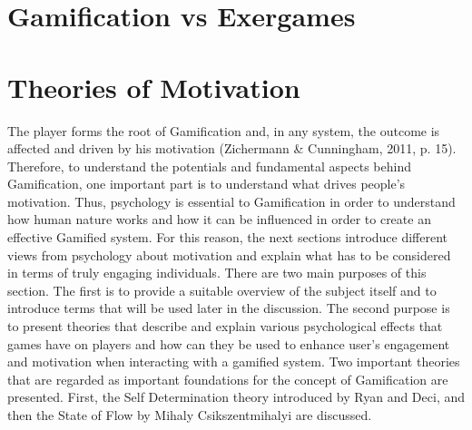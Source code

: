\section{Gamification vs Exergames}

\pagebreak
\section{Theories of Motivation}
The player forms the root of Gamification and, in any system, the outcome is affected and driven by his motivation (Zichermann \& Cunningham, 2011, p. 15). Therefore, to understand the potentials and fundamental aspects behind Gamification, one important part is to understand what drives people's motivation. Thus, psychology is  essential  to  Gamification  in order to understand  how  human  nature  works  and  how  it can  be  influenced  in  order  to  create  an  effective  Gamified  system. For this reason, the next sections introduce different views from psychology about motivation and explain what has to be considered in terms of truly engaging individuals. There are two main purposes of this section. The first is to provide a suitable overview of the subject itself and to introduce terms that will be used later in the discussion. The second purpose is to present theories that describe and explain various psychological effects that games have on players and how can they be used to enhance user's engagement and motivation when interacting with a gamified system. Two important theories that are regarded as important foundations for  the  concept of Gamification are presented. First, the Self Determination theory introduced by Ryan and Deci, and then the State of Flow by Mihaly Csikszentmihalyi are discussed. 


